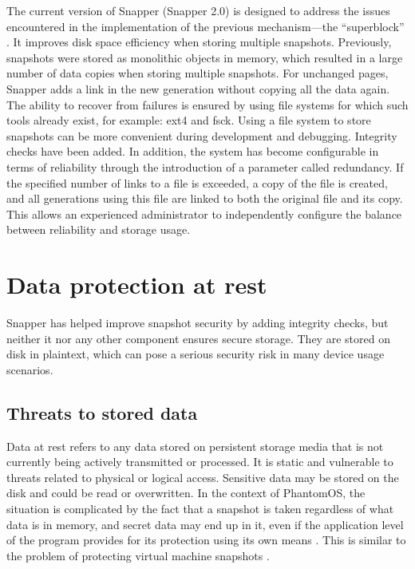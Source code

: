 The current version of Snapper (Snapper 2.0) is designed to address the issues encountered in the implementation of the previous mechanism—the “superblock” \cite{FOSDEM_Snapper, FOSDEM_Snapper_paper}. It improves disk space efficiency when storing multiple snapshots. Previously, snapshots were stored as monolithic objects in memory, which resulted in a large number of data copies when storing multiple snapshots. For unchanged pages, Snapper adds a link in the new generation without copying all the data again. The ability to recover from failures is ensured by using file systems for which such tools already exist, for example: ext4 and fsck. Using a file system to store snapshots can be more convenient during development and debugging. Integrity checks have been added. In addition, the system has become configurable in terms of reliability through the introduction of a parameter called redundancy. If the specified number of links to a file is exceeded, a copy of the file is created, and all generations using this file are linked to both the original file and its copy. This allows an experienced administrator to independently configure the balance between reliability and storage usage.

\section{Data protection at rest}

Snapper has helped improve snapshot security by adding integrity checks, but neither it nor any other component ensures secure storage. They are stored on disk in plaintext, which can pose a serious security risk in many device usage scenarios.

\subsection{Threats to stored data}

Data at rest refers to any data stored on persistent storage media that is not currently being actively transmitted or processed. It is static and vulnerable to threats related to physical or logical access. Sensitive data may be stored on the disk and could be read or overwritten. In the context of PhantomOS, the situation is complicated by the fact that a snapshot is taken regardless of what data is in memory, and secret data may end up in it, even if the application level of the program provides for its protection using its own means \cite{SNIA_PM_Security}. This is similar to the problem of protecting virtual machine snapshots \cite{VM_Security}.

